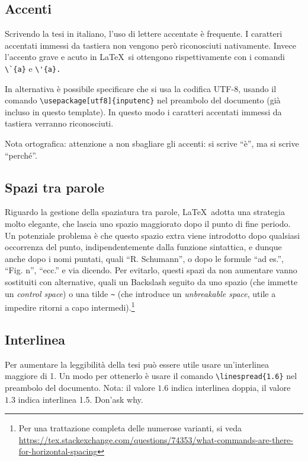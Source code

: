 \documentclass[12pt,italian]{report}
\begin{document}
\subsection{Accenti}

Scrivendo la tesi in italiano, l'uso di lettere accentate \`e frequente. I caratteri accentati immessi da tastiera non vengono per\`o riconosciuti nativamente. Invece l'accento grave e acuto in \LaTeX\ si ottengono rispettivamente con i comandi \verb|\`{a}| e \verb|\'{a}.| 

In alternativa \`e possibile specificare che si usa la codifica UTF-8, usando il comando \verb|\usepackage[utf8]{inputenc}| nel preambolo del documento (già incluso in questo template). In questo modo i caratteri accentati immessi da tastiera verranno riconosciuti.

Nota ortografica: attenzione a non sbagliare gli accenti: si scrive ``\`e'', ma si scrive ``perch\'e''.

\subsection{Spazi tra parole}

Riguardo la gestione della spaziatura tra parole, \LaTeX\ adotta una strategia molto elegante, che lascia uno spazio maggiorato dopo il punto di fine periodo. Un potenziale problema è che questo spazio extra viene introdotto dopo qualsiasi occorrenza del punto, indipendentemente dalla funzione sintattica, e dunque anche dopo i nomi puntati, quali ``R. Schumann'', o dopo le formule ``ad es.'', ``Fig. n'', ``ecc.'' e via dicendo. Per evitarlo, questi spazi da non aumentare vanno sostituiti con alternative, quali un Backslash seguito da uno spazio (che immette un \textit{control space}) o una tilde \verb|~| (che introduce un \textit{unbreakable space}, utile a impedire ritorni a capo intermedi).\footnote{Per una trattazione completa delle numerose varianti, si veda \url{https://tex.stackexchange.com/questions/74353/what-commands-are-there-for-horizontal-spacing}}

\subsection{Interlinea}

Per aumentare la leggibilit\`a della tesi pu\`o essere utile usare un'interlinea maggiore di 1. Un modo per ottenerlo \`e usare il comando \verb|\linespread{1.6}| nel preambolo del documento. Nota: il valore $1.6$ indica interlinea doppia, il valore $1.3$ indica interlinea 1.5. Don'ask why.
\end{document}
